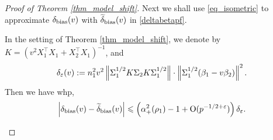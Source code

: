 \begin{proof}[Proof of Theorem \ref{thm_model_shift}]
Next we shall use \eqref{eq_isometric} to approximate $\delta_{\text{bias}}(v)$ with $\widetilde\delta_{\text{bias}}(v)$ in \eqref{deltabetapf}.  
\begin{lemma}\label{prop_model_shift}
	In the setting of Theorem \ref{thm_model_shift},
	we denote by $K = (v^2X_1^{\top}X_1 + X_2^{\top}X_1)^{-1}$, and
	\begin{align*}
		\delta_{{\varepsilon}}(v) := n_1^2 v^2 \left\| \Sigma_1^{1/2} K \Sigma_2 K \Sigma_1^{1/2} \right\| \cdot \left\| \Sigma_1^{1/2} (\beta_1 - v\beta_2) \right\|^2.
	\end{align*}
	Then we have whp,
	\begin{align*}
		 \left| \delta_{\text{bias}}(v)-\widetilde\delta_{\text{bias}}(v)\right| 
		\leqslant  \left( \alpha_+^2(\rho_1)-1 + \operatorname{O}(p^{-1/2+{\varepsilon}})\right)\delta_{\varepsilon}.
	\end{align*}
\end{lemma}


\end{proof}
